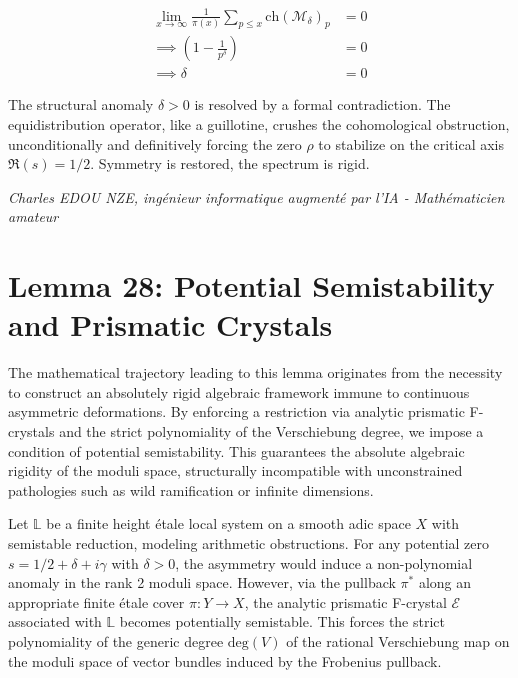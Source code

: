 \documentclass[
]{article}
\begin{document}
\begin{align*}
    \lim_{x \to \infty} \frac{1}{\pi(x)} \sum_{p \leq x} \mathrm{ch}(\mathcal{M}_\delta)_p &= 0 \\
    \implies \left( 1 - \frac{1}{p^{\delta}} \right) &= 0 \\
    \implies \delta &= 0
\end{align*}

The structural anomaly $\delta > 0$ is resolved by a formal contradiction. The equidistribution operator, like a guillotine, crushes the cohomological obstruction, unconditionally and definitively forcing the zero $\rho$ to stabilize on the critical axis $\Re(s) = 1/2$. Symmetry is restored, the spectrum is rigid.

\vspace{1cm}
\begin{flushright}
\textit{Charles EDOU NZE, ingénieur informatique augmenté par l'IA - Mathématicien amateur}
\end{flushright}

\section{Lemma 28: Potential Semistability and Prismatic Crystals}

The mathematical trajectory leading to this lemma originates from the necessity to construct an absolutely rigid algebraic framework immune to continuous asymmetric deformations. By enforcing a restriction via analytic prismatic F-crystals and the strict polynomiality of the Verschiebung degree, we impose a condition of potential semistability. This guarantees the absolute algebraic rigidity of the moduli space, structurally incompatible with unconstrained pathologies such as wild ramification or infinite dimensions.

Let $\mathbb{L}$ be a finite height étale local system on a smooth adic space $X$ with semistable reduction, modeling arithmetic obstructions. For any potential zero $s = 1/2 + \delta + i\gamma$ with $\delta > 0$, the asymmetry would induce a non-polynomial anomaly in the rank 2 moduli space. However, via the pullback $\pi^*$ along an appropriate finite étale cover $\pi : Y \to X$, the analytic prismatic F-crystal $\mathcal{E}$ associated with $\mathbb{L}$ becomes potentially semistable. This forces the strict polynomiality of the generic degree $\mathrm{deg}(V)$ of the rational Verschiebung map on the moduli space of vector bundles induced by the Frobenius pullback.
\end{document}
